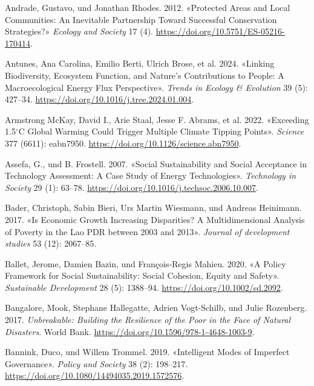 \documentclass[
  nswissgerman,
  a4paper,
  DIV=11,
  numbers=noendperiod,
  oneside,
  openany]{scrreprt}
\newlength{\cslhangindent}
\newenvironment{CSLReferences}[2] %
 {\begin{list}{}{%
  \setlength{\itemindent}{0pt}
  \setlength{\leftmargin}{0pt}
  \setlength{\parsep}{0pt}
  \ifodd #1
   \setlength{\leftmargin}{\cslhangindent}
   \setlength{\itemindent}{-1\cslhangindent}
  \fi
  \setlength{\itemsep}{#2\baselineskip}}}
 {\end{list}}
\begin{document}
\begin{CSLReferences}{1}{1}
Andrade, Gustavo, und Jonathan Rhodes. 2012. {«Protected {Areas} and
{Local Communities}: An {Inevitable Partnership} Toward {Successful
Conservation Strategies}?»} \emph{Ecology and Society} 17 (4).
\url{https://doi.org/10.5751/ES-05216-170414}.

Antunes, Ana Carolina, Emilio Berti, Ulrich Brose, et al. 2024.
{«Linking Biodiversity, Ecosystem Function, and {Nature}'s Contributions
to People: A Macroecological Energy Flux Perspective»}. \emph{Trends in
Ecology \& Evolution} 39 (5): 427--34.
\url{https://doi.org/10.1016/j.tree.2024.01.004}.

Armstrong McKay, David I., Arie Staal, Jesse F. Abrams, et al. 2022.
{«Exceeding 1.5{\(^\circ\)}{C} Global Warming Could Trigger Multiple
Climate Tipping Points»}. \emph{Science} 377 (6611): eabn7950.
\url{https://doi.org/10.1126/science.abn7950}.

Assefa, G., und B. Frostell. 2007. {«Social Sustainability and Social
Acceptance in Technology Assessment: {A} Case Study of Energy
Technologies»}. \emph{Technology in Society} 29 (1): 63--78.
\url{https://doi.org/10.1016/j.techsoc.2006.10.007}.

Bader, Christoph, Sabin Bieri, Urs Martin Wiesmann, und Andreas
Heinimann. 2017. {«Is Economic Growth Increasing Disparities? {A}
Multidimensional Analysis of Poverty in the {Lao PDR} between 2003 and
2013»}. \emph{Journal of development studies} 53 (12): 2067--85.

Ballet, Jerome, Damien Bazin, und François-Regis Mahieu. 2020. {«A
Policy Framework for Social Sustainability: {Social} Cohesion, Equity
and Safety»}. \emph{Sustainable Development} 28 (5): 1388--94.
\url{https://doi.org/10.1002/sd.2092}.

Bangalore, Mook, Stephane Hallegatte, Adrien Vogt-Schilb, und Julie
Rozenberg. 2017. \emph{Unbreakable: {Building} the {Resilience} of the
{Poor} in the {Face} of {Natural Disasters}}. World Bank.
\url{https://doi.org/10.1596/978-1-4648-1003-9}.

Bannink, Duco, und Willem Trommel. 2019. {«Intelligent Modes of
Imperfect Governance»}. \emph{Policy and Society} 38 (2): 198--217.
\url{https://doi.org/10.1080/14494035.2019.1572576}.


\end{CSLReferences}
\end{document}
